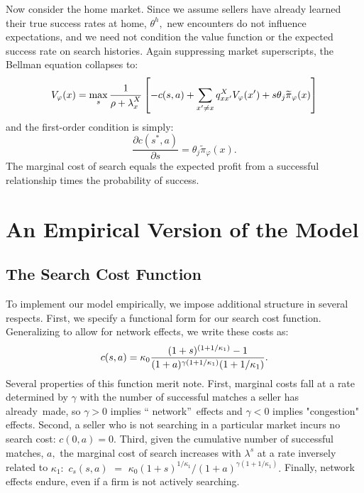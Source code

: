 \documentclass[12pt,titlepage]{article}
\begin{document}
Now consider the home market. Since we assume sellers have already learned
their true success rates at home, $\theta ^{h},$ new encounters do not
influence expectations, and we need not condition the value function or the
expected success rate on search histories$.$ Again suppressing market
superscripts, the Bellman equation collapses to:%
\begin{equation}
V_{\varphi }(x)=\max_{s}\frac{1}{\rho +\lambda _{x}^{X}}\left[
-c(s,a)+\sum_{x^{\prime }\neq x}q_{xx^{\prime }}^{X}V_{\varphi }(x^{\prime
})+s\theta _{j}\widetilde{\pi }_{\varphi }(x)\right]  \notag
\end{equation}%
and the first-order condition is simply:%
\begin{equation*}
\frac{\partial c(s^{\ast },a)}{\partial s}=\theta _{j}\widetilde{\pi }%
_{\varphi }(x).
\end{equation*}%
The marginal cost of search equals the expected profit from a successful
relationship times the probability of success.

\section{An Empirical Version of the Model}

\subsection{The Search Cost Function}

To implement our model empirically, we impose additional structure in
several respects. First, we specify a functional form for our search cost
function. Generalizing \citet{arkolakis2010market} to allow for network effects, we write these costs as:%
\begin{equation}
c(s,a)=\kappa _{0}\frac{(1+s)^{(1+1/\kappa _{1})}-1}{%
(1+a)^{\gamma (1+1/\kappa _{1})}(1+1/\kappa _{1})}.  \label{cost of effort}
\end{equation}%
Several properties of this function merit note. First, marginal costs fall
at a rate determined by $\gamma $ with the number of successful matches a
seller has already\ made, so $\gamma >0$ implies \textquotedblleft
network\textquotedblright\ effects and $\gamma <0$ implies "congestion"
effects.\footnotemark{}
Second, a seller who is not searching in a particular market incurs no
search cost: $c(0,a)=0.$ Third, given the cumulative number of successful
matches, $a,$ the marginal cost of search increases with $\lambda ^{s}$ at a
rate inversely related to $\kappa _{1}:$ $c_{s}(s,a)$ $=$ $\kappa _{0}
(1+s)^{1/\kappa_{1}}/(1+a)^{\gamma (1+1/\kappa _{1})}.$ Finally, network effects
endure, even if a firm is not actively searching.
\end{document}
